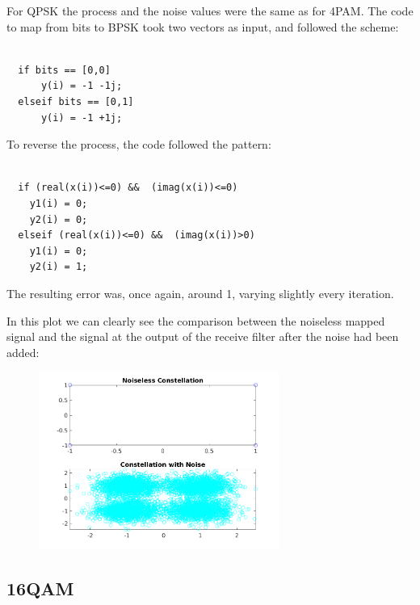 \documentclass[a4paper,11pt]{article}
\begin{document}
For QPSK the process and the noise values were the same as for 4PAM. The code
to map from bits to BPSK took two vectors as input, and followed the scheme:

\bigskip
\begin{lstlisting}

  if bits == [0,0]
      y(i) = -1 -1j;
  elseif bits == [0,1]
      y(i) = -1 +1j;

\end{lstlisting}
\bigskip

To reverse the process, the code followed the pattern:

\bigskip
\begin{lstlisting}

  if (real(x(i))<=0) &&  (imag(x(i))<=0)
    y1(i) = 0;
    y2(i) = 0;
  elseif (real(x(i))<=0) &&  (imag(x(i))>0)
    y1(i) = 0;
    y2(i) = 1;

\end{lstlisting}
\bigskip

The resulting error was, once again, around 1, varying slightly every iteration.

In this plot we can clearly see the comparison between the noiseless mapped
signal and the signal at the output of the receive filter after the noise had
been added:

\begin{figure}[!hp]
    \begin{center}
      \includegraphics[width=0.7\textwidth]{images/QPSK.png}
    \end{center}
\end{figure}

\newpage

\subsection{16QAM}
\end{document}
